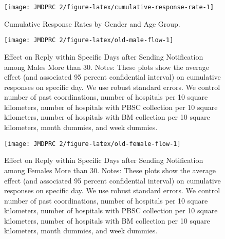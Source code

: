 \documentclass[12pt, a4paper]{article}
\begin{document}
\begin{figure}[H]
\texttt{[image: JMDPRC~2/figure-latex/cumulative-response-rate-1]} \caption{Cumulative Response Rates by Gender and Age Group.}\label{fig:cumulative-response-rate}
\end{figure}

\begin{figure}[H]
\texttt{[image: JMDPRC~2/figure-latex/old-male-flow-1]} \caption{Effect on Reply within Specific Days after Sending Notification among Males More than 30. Notes: These plots show the average effect (and associated 95 percent confidential interval) on cumulative responses on specific day. We use robust standard errors. We control number of past coordinations, number of hospitals per 10 square kilometers, number of hospitals with PBSC collection per 10 square kilometers, number of hospitals with BM collection per 10 square kilometers, month dummies, and week dummies.}\label{fig:old-male-flow}
\end{figure}

\begin{figure}[H]
\texttt{[image: JMDPRC~2/figure-latex/old-female-flow-1]} \caption{Effect on Reply within Specific Days after Sending Notification among Females More than 30. Notes: These plots show the average effect (and associated 95 percent confidential interval) on cumulative responses on specific day. We use robust standard errors. We control number of past coordinations, number of hospitals per 10 square kilometers, number of hospitals with PBSC collection per 10 square kilometers, number of hospitals with BM collection per 10 square kilometers, month dummies, and week dummies.}\label{fig:old-female-flow}
\end{figure}
\end{document}
